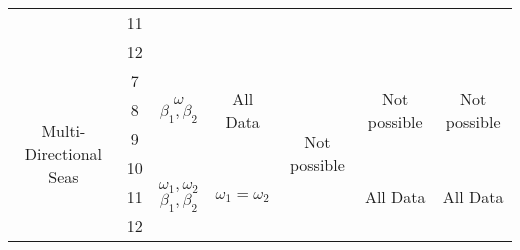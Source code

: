 \begin{table}
{\begin{tabular}{ccccccc}
            & 11  &  &  &  &  &  \\
            & 12  &  &  &  &  &  \\
      \midrule
         \multirow{6}{*}{\parbox[c]{18mm}{\centering Multi-Directional Seas}}
            &  7  &  \multirow{3}{*}{\parbox[c]{15mm}{\centering $\omega$\\$\beta_1,\beta_2$}}
                  &  \multirow{3}{*}{\parbox[c]{15mm}{\centering All Data}}   %
                     &  \multirow{6}{*}{\parbox[c]{15mm}{\centering Not possible}}
                        &  \multirow{3}{*}{\parbox[c]{15mm}{\centering Not possible}}
                           &  \multirow{3}{*}{\parbox[c]{15mm}{\centering Not possible}}
                                 \\
            &  8  &  &  &  &  &  \\
            &  9  &  &  &  &  &  \\ \cmidrule(lr){2-4} \cmidrule(lr){6-7}
            & 10  &  \multirow{3}{*}{\parbox[c]{15mm}{\centering $\omega_1,\omega_2$\\$\beta_1,\beta_2$}}
                  &  \multirow{3}{*}{\parbox[c]{15mm}{\centering $\omega_1=\omega_2$}}
                     &  &  \multirow{3}{*}{\parbox[c]{15mm}{\centering All Data}}
                           &  \multirow{3}{*}{\parbox[c]{15mm}{\centering All Data}}
                                 \\
            & 11  &  &  &  &  &  \\
            & 12  &  &  &  &  &  \\
      \bottomrule
   \end{tabular}
   }
\end{table}



